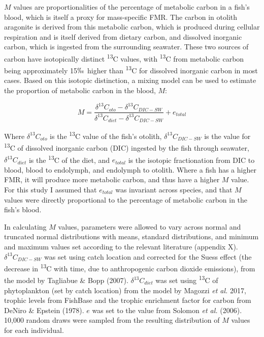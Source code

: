 \documentclass[12pt, titlepage]{article}
\begin{document}
$M$ values are proportionalities %
of the percentage of metabolic carbon in a fish's blood, which is itself a proxy for mass-specific FMR.
The carbon in otolith aragonite is derived from this metabolic carbon, which is produced during cellular respiration and is itself derived from dietary carbon, and dissolved inorganic carbon, which is ingested from the surrounding seawater.
These two sources of carbon have isotopically distinct \textdelta \textsuperscript{13}C values, with \textdelta \textsuperscript{13}C from metabolic carbon being approximately 15$\permil$ higher than \textdelta \textsuperscript{13}C for dissolved inorganic carbon in most cases. %
Based on this isotopic distinction, a mixing model can be used to estimate the proportion of metabolic carbon in the blood, $M$:

\begin{equation}
M = \frac{\delta^{13}C_{oto}-\delta^{13}C_{DIC-SW}}{\delta^{13}C_{diet}-\delta^{13}C_{DIC-SW}} + e_{total}
\end{equation}

\noindent Where $\delta^{13}C_{oto}$ is the \textdelta \textsuperscript{13}C value of the fish's otolith, $\delta^{13}C_{DIC-SW}$ is the value for \textdelta \textsuperscript{13}C of dissolved inorganic carbon (DIC) ingested by the fish through seawater, $\delta^{13}C_{diet}$ is the \textdelta \textsuperscript{13}C of the diet, and $e_{total}$ is the isotopic fractionation from DIC to blood, blood to endolymph, and endolymph to otolith. 
Where a fish has a higher FMR, it will produce more metabolic carbon, and thus have a higher $M$ value. 
For this study I assumed that $e_{total}$ was invariant across species, and that $M$ values were directly proportional to the percentage of metabolic carbon in the fish's blood.

In calculating $M$ values, parameters were allowed to vary across normal and truncated normal distributions with means, standard distributions, and minimum and maximum values set according to the relevant literature (appendix X). %
$\delta^{13}C_{DIC-SW}$ was set using catch location and corrected for the Suess effect (the decrease in \textdelta \textsuperscript{13}C with time, due to anthropogenic carbon dioxide emissions), from the model by Tagliabue \& Bopp (2007).
$\delta^{13}C_{diet}$ was set using \textdelta \textsuperscript{13}C of phytoplankton (set by catch location) from the model by Magozzi \textit{et al.} 2017, trophic levels from FishBase %
and the trophic enrichment factor for carbon from DeNiro \& Epstein (1978).
$e$ was set to the value from Solomon \textit{et al.} (2006).
10,000 random draws were sampled from the resulting distribution of $M$ values for each individual.
\end{document}
